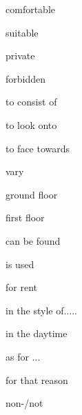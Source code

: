 \documentclass[avery5371,grid,frame]{flashcards}
\begin{document}
\begin{flashcard}{\LARGE comfortable}
\LARGE {}
\end{flashcard}
\begin{flashcard}{\LARGE suitable}
\LARGE {}
\end{flashcard}
\begin{flashcard}{\LARGE private}
\LARGE {}
\end{flashcard}
\begin{flashcard}{\LARGE forbidden}
\LARGE {}
\end{flashcard}
\begin{flashcard}{\LARGE to consist of}
\LARGE {}
\end{flashcard}
\begin{flashcard}{\LARGE to look onto}
\LARGE {}
\end{flashcard}
\begin{flashcard}{\LARGE to face towards}
\LARGE {}
\end{flashcard}
\begin{flashcard}{\LARGE vary}
\LARGE {}
\end{flashcard}
\begin{flashcard}{\LARGE ground floor}
\LARGE {}
\end{flashcard}
\begin{flashcard}{\LARGE first floor}
\LARGE {}
\end{flashcard}
\begin{flashcard}{\LARGE can be found}
\LARGE {}
\end{flashcard}
\begin{flashcard}{\LARGE is used}
\LARGE {}
\end{flashcard}
\begin{flashcard}{\LARGE for rent}
\LARGE {}
\end{flashcard}
\begin{flashcard}{\LARGE in the style of.....}
\LARGE {}
\end{flashcard}
\begin{flashcard}{\LARGE in the daytime}
\LARGE {}
\end{flashcard}
\begin{flashcard}{\LARGE as for ...}
\LARGE {}
\end{flashcard}
\begin{flashcard}{\LARGE for that reason}
\LARGE {}
\end{flashcard}
\begin{flashcard}{\LARGE non-/not}
\LARGE {}
\end{flashcard}
\end{document}
